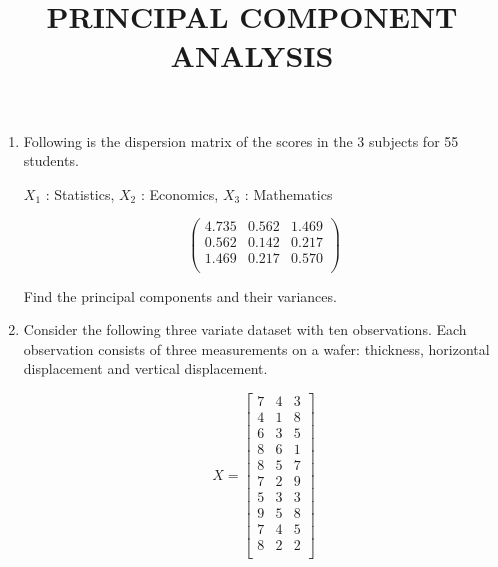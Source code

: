 \documentclass[11pt, a4paper]{article}
\title{\textbf{PRINCIPAL COMPONENT ANALYSIS}}
\author{}
\date{}
\begin{document}
\maketitle



\begin{enumerate}






	\item Following is the dispersion matrix of the scores in the 3 subjects for 55 students. 
	
	\begin{center}
	$X_1$ : Statistics, $X_2$ : Economics, $X_3$ : Mathematics
	\end{center}
	
	$$\begin{pmatrix}
	4.735 & 0.562 & 1.469 \\
	0.562 & 0.142 & 0.217 \\
	1.469 & 0.217 & 0.570 \\
	\end{pmatrix}$$


\vspace{0.5cm}

	Find the principal components and their variances.
	
	
	
	
	
	
	
	
	
	
	
	
	
\vspace{2cm}









	\item Consider the following three variate dataset with ten observations. Each observation consists of three measurements on a wafer: thickness, horizontal displacement and vertical displacement. 


\[
X = \begin{bmatrix}
7 & 4 & 3 \\
4 & 1 & 8 \\
6 & 3 & 5 \\
8 & 6 & 1 \\
8 & 5 & 7 \\
7 & 2 & 9 \\
5 & 3 & 3 \\
9 & 5 & 8 \\
7 & 4 & 5 \\
8 & 2 & 2 \\
\end{bmatrix}
\]	



\end{enumerate}
\end{document}
